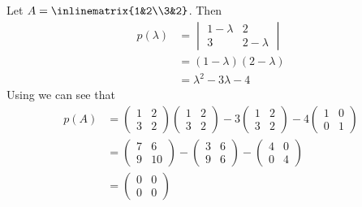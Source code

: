 \begin{exm}
	Let $A=\inlinematrix{1&2\\3&2}$. Then
	\begin{align*}
		p(\lambda) & =\begin{vmatrix}
			1-\lambda & 2         \\
			3         & 2-\lambda
		\end{vmatrix} \\
		           & =(1-\lambda)(2-\lambda)      \\
		           & =\lambda^2-3\lambda-4
	\end{align*}
	Using  we can see that
	\begin{align*}
		p(A) & =\begin{pmatrix}
			1 & 2 \\3&2
		\end{pmatrix}\begin{pmatrix}
			1 & 2 \\3&2
		\end{pmatrix}-3\begin{pmatrix}
			1 & 2 \\3&2
		\end{pmatrix}-4\begin{pmatrix}
			1 & 0 \\0&1
		\end{pmatrix} \\
		     & =\begin{pmatrix}
			7 & 6 \\9&10
		\end{pmatrix}-
		\begin{pmatrix}
			3 & 6 \\9&6
		\end{pmatrix}-
		\begin{pmatrix}
			4 & 0 \\0&4
		\end{pmatrix}                                                                                              \\
		     & =\begin{pmatrix}
			0 & 0 \\0&0
		\end{pmatrix}
	\end{align*}
\end{exm}
